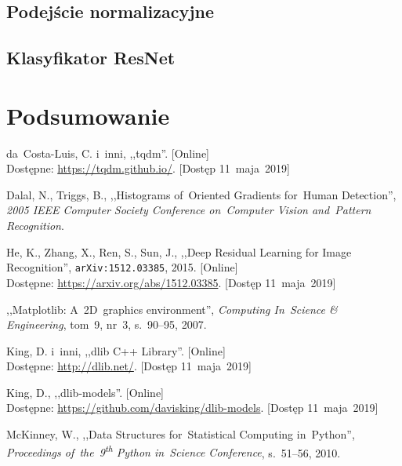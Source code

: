 \documentclass[11pt,a4paper]{article}
\begin{document}
\subsection{Podejście normalizacyjne}

\subsection{Klasyfikator ResNet}

\section{Podsumowanie}

\begin{thebibliography}{9}

        da~Costa-Luis, C. i~inni,
        ,,tqdm''.
        [Online]
        \\
        Dostępne: \url{https://tqdm.github.io/}.
        [Dostęp 11~maja~2019]

        Dalal, N.,
        Triggs, B.,
        ,,Histograms of~Oriented Gradients for~Human Detection'',
        \emph{2005 IEEE Computer Society Conference on~Computer Vision and~Pattern Recognition}.

        He, K.,
        Zhang, X.,
        Ren, S.,
        Sun, J.,
        ,,Deep Residual Learning for Image Recognition'',
        {\tt arXiv:1512.03385},
        2015.
        [Online]
        \\
        Dostępne: \url{https://arxiv.org/abs/1512.03385}.
        [Dostęp 11~maja~2019]

        ,,Matplotlib: A~2D~graphics environment'',
        \emph{Computing In~Science \& Engineering},
        tom~9,
        nr~3,
        s.~90--95,
        2007.

        King, D. i~inni,
        ,,dlib C++ Library''.
        [Online]
        \\
        Dostępne: \url{http://dlib.net/}.
        [Dostęp 11~maja~2019]

        King, D.,
        ,,dlib-models''.
        [Online]
        \\
        Dostępne: \url{https://github.com/davisking/dlib-models}.
        [Dostęp 11~maja~2019]

        McKinney, W.,
        ,,Data Structures for~Statistical Computing in~Python'',
        \emph{Proceedings of~the~9\textsuperscript{th} Python in~Science Conference},
        s.~51--56,
        2010.


\end{thebibliography}
\end{document}
